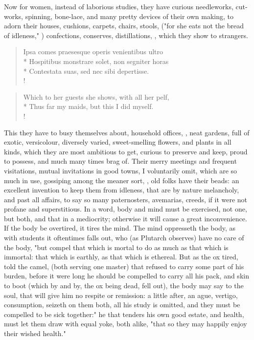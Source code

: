 {Now for women, instead of laborious studies, they have curious needleworks, cut-works, spinning, bone-lace, and many pretty devices of their own making, to adorn their houses, cushions, carpets, chairs, stools, ("for she eats not the bread of idleness,"  ) confections, conserves, distillations, \etc{}, which they show to strangers.

%
\begin{latin}%
\begin{verse}%
Ipsa comes praesesque operis venientibus ultro\\*
Hospitibus monstrare solet, non segniter horas\\*
Contestata suas, sed nec sibi depertisse.\\!
\end{verse}%
\end{latin}%
\translationrule%
\begin{verse}%
Which to her guests she shows, with all her pelf,\\*
Thus far my maids, but this I did myself.\\!
\end{verse}%

This they have to busy themselves about, household offices, \etc{}, neat gardens, full of exotic, versicolour, diversely varied, sweet-smelling flowers, and plants in all kinds, which they are most ambitious to get, curious to preserve and keep, proud to possess, and much many times brag of. Their merry meetings and frequent visitations, mutual invitations in good towns, I voluntarily omit, which are so much in use, gossiping among the meaner sort, \etc{}, old folks have their beads: an excellent invention to keep them from idleness, that are by nature melancholy, and past all affairs, to say so many paternosters, avemarias, creeds, if it were not profane and superstitious. In a word, body and mind must be exercised, not one, but both, and that in a mediocrity; otherwise it will cause a great inconvenience. If the body be overtired, it tires the mind. The mind oppresseth the body, as with students it oftentimes falls out, who (as Plutarch observes) have no care of the body, "but compel that which is mortal to do as much as that which is immortal: that which is earthly, as that which is ethereal. But as the ox tired, told the camel, (both serving one master) that refused to carry some part of his burden, before it were long he should be compelled to carry all his pack, and skin to boot (which by and by, the ox being dead, fell out), the body may say to the soul, that will give him no respite or remission: a little after, an ague, vertigo, consumption, seizeth on them both, all his study is omitted, and they must be compelled to be sick together:" he that tenders his own good estate, and health, must let them draw with equal yoke, both alike, "that so they may happily enjoy their wished health."

}
